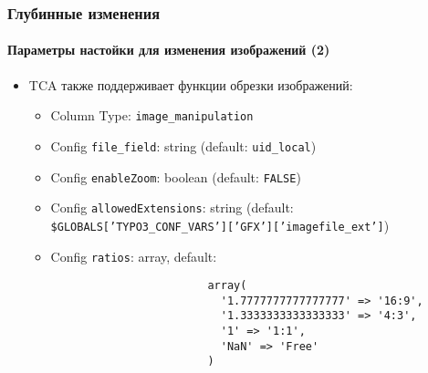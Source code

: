 \begin{frame}[fragile]
	\frametitle{Глубинные изменения}
	\framesubtitle{Параметры настойки для изменения изображений (2)}

	\lstset{basicstyle=\smaller\ttfamily}

	\begin{itemize}
		\item TCA также поддерживает функции обрезки изображений:

			\begin{itemize}
				\item Column Type: \texttt{image\_manipulation}
				\item Config \texttt{file\_field}: string	\tabto{5.6cm}(default: \texttt{uid\_local})
				\item Config \texttt{enableZoom}: boolean	\tabto{5.6cm}(default: \texttt{FALSE})
				\item Config \texttt{allowedExtensions}: string\newline
					(default: \smaller\texttt{\$GLOBALS['TYPO3\_CONF\_VARS']['GFX']['imagefile\_ext']}\small)
				\item Config \texttt{ratios}: array, default:

					\begin{lstlisting}
						array(
						  '1.7777777777777777' => '16:9',
						  '1.3333333333333333' => '4:3',
						  '1' => '1:1',
						  'NaN' => 'Free'
						)
					\end{lstlisting}
			\end{itemize}

	\end{itemize}

\end{frame}

